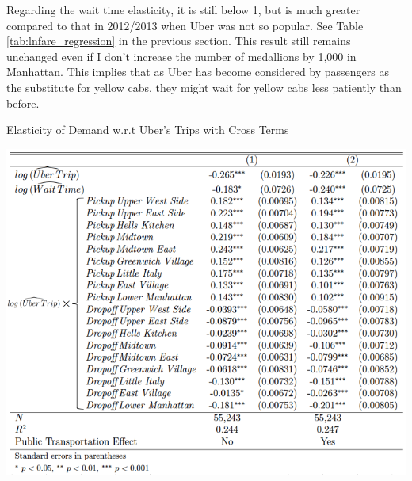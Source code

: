 Regarding the wait time elasticity, it is still below 1, but is much greater compared to that in 2012/2013 when Uber was not so popular. See Table \ref{tab:lnfare_regression} in the previous section. This result still remains unchanged even if I don't increase the number of medallions by 1,000 in Manhattan.  This implies that as Uber has become considered by passengers as the substitute for yellow cabs, they might wait for yellow cabs less patiently than before.

\begin{table}[h]
\centering
\caption{Elasticity of Demand w.r.t Uber's Trips with Cross Terms}\label{tab:lnuber_cross_regression}
\vspace{0.2cm}
\includegraphics[width=16cm]{Tables/lnuber_cross_regression.png}
\end{table}


